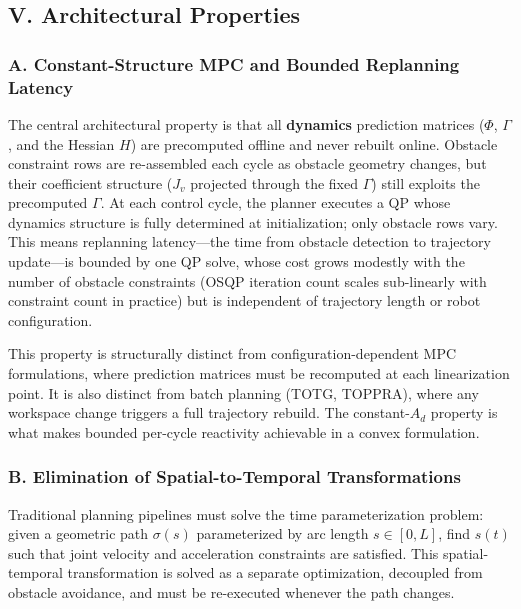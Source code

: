 \subsection{V. Architectural
Properties}\label{v.-architectural-properties}

\subsubsection{A. Constant-Structure MPC and Bounded Replanning
Latency}\label{a.-constant-structure-mpc-and-bounded-replanning-latency}

The central architectural property is that all \textbf{dynamics}
prediction matrices (\(\Phi\), \(\Gamma\), and the Hessian \(H\)) are
precomputed offline and never rebuilt online. Obstacle constraint rows
are re-assembled each cycle as obstacle geometry changes, but their
coefficient structure (\(J_v\) projected through the fixed \(\Gamma\))
still exploits the precomputed \(\Gamma\). At each control cycle, the
planner executes a QP whose dynamics structure is fully determined at
initialization; only obstacle rows vary. This means replanning
latency---the time from obstacle detection to trajectory update---is
bounded by one QP solve, whose cost grows modestly with the number of
obstacle constraints (OSQP iteration count scales sub-linearly with
constraint count in practice) but is independent of trajectory length or
robot configuration.

This property is structurally distinct from configuration-dependent MPC
formulations, where prediction matrices must be recomputed at each
linearization point. It is also distinct from batch planning (TOTG,
TOPPRA), where any workspace change triggers a full trajectory rebuild.
The constant-\(A_d\) property is what makes bounded per-cycle reactivity
achievable in a convex formulation.

\subsubsection{B. Elimination of Spatial-to-Temporal
Transformations}\label{b.-elimination-of-spatial-to-temporal-transformations}

Traditional planning pipelines must solve the time parameterization
problem: given a geometric path \(\sigma(s)\) parameterized by arc
length \(s \in [0,L]\), find \(s(t)\) such that joint velocity and
acceleration constraints are satisfied. This spatial-temporal
transformation is solved as a separate optimization, decoupled from
obstacle avoidance, and must be re-executed whenever the path changes.

